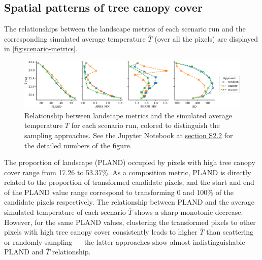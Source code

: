 \documentclass[10pt,letterpaper]{article}
\begin{document}
\subsection*{Spatial patterns of tree canopy cover}

The relationships between the landscape metrics of each scenario run and the corresponding simulated average temperature $\overline{T}$ (over all the pixels) are displayed in \autoref{fig:scenario-metrics}.
\begin{figure}
  \begin{adjustwidth}{-.4\textwidth}{0cm}  
    \includegraphics[width=.99\linewidth]{figures/scenario-metrics}
    \caption{\label{fig:scenario-metrics} Relationship between landscape metrics and the simulated average temperature $\overline{T}$ for each scenario run, colored to distinguish the sampling approaches. See the Jupyter Notebook at \hyperref[sec:si-scenario-metrics]{section S2.2} for the detailed numbers of the figure.}
  \end{adjustwidth}
\end{figure}
The proportion of landscape (PLAND) occupied by pixels with high tree canopy cover range from 17.26 to 53.37\%. As a composition metric, PLAND is directly related to the proportion of transformed candidate pixels, and the start and end of the PLAND value range correspond to transforming 0 and 100\% of the candidate pixels respectively.
The relationship between PLAND and the average simulated temperature of each scenario $\overline{T}$ shows a sharp monotonic decrease. However, for the same PLAND values, clustering the transformed pixels to other pixels with high tree canopy cover consistently leads to higher $\overline{T}$ than scattering or randomly sampling --- the latter approaches show almost indistinguishable PLAND and $\overline{T}$ relationship.
\end{document}
